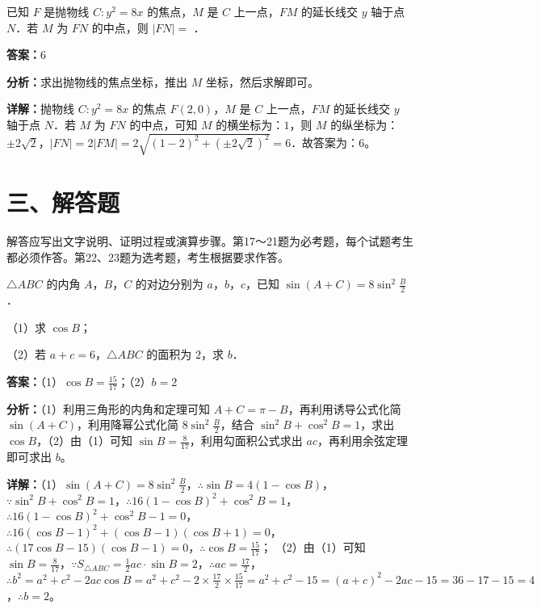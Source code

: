 \begin{question}[points=5]
已知 $F$ 是抛物线 $C:y^2=8x$ 的焦点，$M$ 是 $C$ 上一点，$FM$ 的延长线交 $y$ 轴于点 $N$．若 $M$ 为 $FN$ 的中点，则 $|FN|=$ ．
\fillin[{$6$}]
\begin{solution}
\textbf{答案：}$6$

\textbf{分析：}求出抛物线的焦点坐标，推出 $M$ 坐标，然后求解即可。

\textbf{详解：}抛物线 $C:y^2=8x$ 的焦点 $F(2,0)$，$M$ 是 $C$ 上一点，$FM$ 的延长线交 $y$ 轴于点 $N$．若 $M$ 为 $FN$ 的中点，可知 $M$ 的横坐标为：$1$，则 $M$ 的纵坐标为：$\pm2\sqrt{2}$，$|FN|=2|FM|=2\sqrt{(1-2)^2+(\pm2\sqrt{2})^2}=6$．故答案为：$6$。
\end{solution}
\end{question}

\section*{三、解答题}
解答应写出文字说明、证明过程或演算步骤。第17～21题为必考题，每个试题考生都必须作答。第22、23题为选考题，考生根据要求作答。

\begin{question}[points=12]
$\triangle ABC$ 的内角 $A$，$B$，$C$ 的对边分别为 $a$，$b$，$c$，已知 $\sin(A+C)=8\sin^2\frac{B}{2}$．

（1）求 $\cos B$；

（2）若 $a+c=6$，$\triangle ABC$ 的面积为 $2$，求 $b$．
\begin{solution}
\textbf{答案：}（1）$\cos B=\frac{15}{17}$；（2）$b=2$

\textbf{分析：}（1）利用三角形的内角和定理可知 $A+C=\pi-B$，再利用诱导公式化简 $\sin(A+C)$，利用降幂公式化简 $8\sin^2\frac{B}{2}$，结合 $\sin^2B+\cos^2B=1$，求出 $\cos B$，（2）由（1）可知 $\sin B=\frac{8}{17}$，利用勾面积公式求出 $ac$，再利用余弦定理即可求出 $b$。

\textbf{详解：}（1）$\sin(A+C)=8\sin^2\frac{B}{2}$，$\therefore\sin B=4(1-\cos B)$，$\because\sin^2B+\cos^2B=1$，$\therefore16(1-\cos B)^2+\cos^2B=1$，$\therefore16(1-\cos B)^2+\cos^2B-1=0$，$\therefore16(\cos B-1)^2+(\cos B-1)(\cos B+1)=0$，$\therefore(17\cos B-15)(\cos B-1)=0$，$\therefore\cos B=\frac{15}{17}$；
（2）由（1）可知 $\sin B=\frac{8}{17}$，$\because S_{\triangle ABC}=\frac{1}{2}ac\cdot\sin B=2$，$\therefore ac=\frac{17}{2}$，$\therefore b^2=a^2+c^2-2ac\cos B=a^2+c^2-2\times\frac{17}{2}\times\frac{15}{17}=a^2+c^2-15=(a+c)^2-2ac-15=36-17-15=4$，$\therefore b=2$。
\end{solution}
\end{question}

